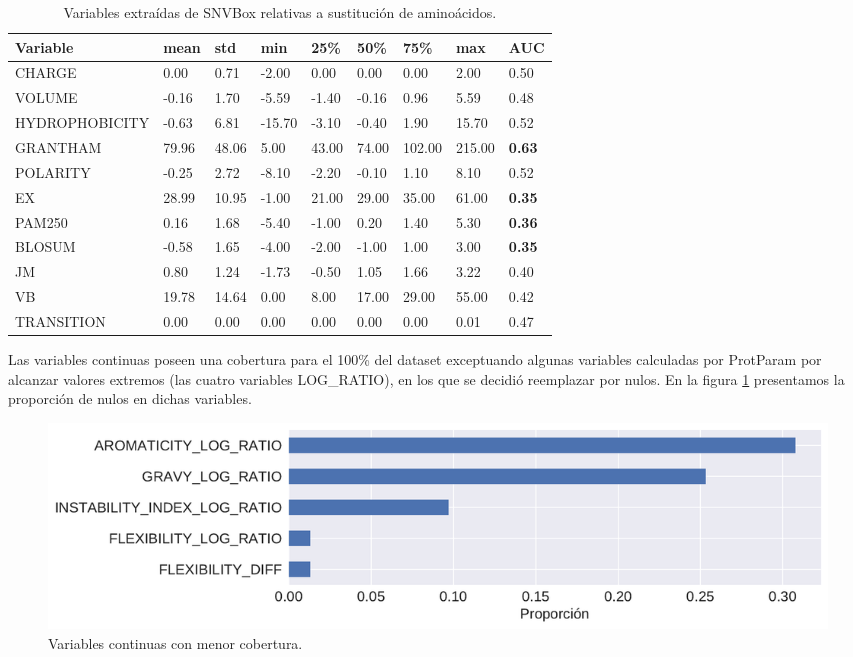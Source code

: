 \begin{table}[H]
\centering
\begin{tabular}{|l|l|l|l|l|l|l|l|l|}
\hline
Variable & mean   & std    & min    & 25\%  & 50\%   & 75\% & max & AUC    \\ \hline
CHARGE            & 0.00  & 0.71   & -2.00  & 0.00  & 0.00   & 0.00 & 2.00 & 0.50   \\ \hline
VOLUME            & -0.16  & 1.70   & -5.59  & -1.40 & -0.16  & 0.96 & 5.59 & 0.48   \\ \hline
HYDROPHOBICITY    & -0.63  & 6.81   & -15.70 & -3.10 & -0.40  & 1.90 & 15.70 & 0.52  \\ \hline
GRANTHAM          & 79.96  & 48.06  & 5.00   & 43.00 & 74.00  & 102.00 & 215.00 &  \textbf{0.63} \\ \hline
POLARITY          & -0.25  & 2.72   & -8.10  & -2.20 & -0.10  & 1.10   & 8.10 & 0.52   \\ \hline
EX                & 28.99  & 10.95  & -1.00  & 21.00 & 29.00  & 35.00  & 61.00 & \textbf{0.35}  \\ \hline
PAM250            & 0.16   & 1.68   & -5.40  & -1.00 & 0.20   & 1.40   & 5.30 & \textbf{0.36}   \\ \hline
BLOSUM            & -0.58  & 1.65   & -4.00  & -2.00 & -1.00  & 1.00   & 3.00 & \textbf{0.35}   \\ \hline
JM                & 0.80   & 1.24   & -1.73  & -0.50 & 1.05   & 1.66   & 3.22 & 0.40   \\ \hline
VB                & 19.78  & 14.64  & 0.00   & 8.00  & 17.00  & 29.00  & 55.00 & 0.42  \\ \hline
TRANSITION        & 0.00   & 0.00   & 0.00   & 0.00  & 0.00   & 0.00   & 0.01 & 0.47   \\ \hline
\end{tabular}
\caption{Variables extraídas de SNVBox relativas a sustitución de aminoácidos.}
\label{tab:snvbox_amino}

\end{table}

Las variables continuas poseen una cobertura para el 100\% del dataset exceptuando algunas variables calculadas por ProtParam por alcanzar valores extremos (las cuatro variables LOG\_RATIO), en los que se decidió reemplazar por nulos. En la figura \ref{fig:proporcion_nulos_structural} presentamos la proporción de nulos en dichas variables.

\begin{figure}[H]
    \centering
    \includegraphics[scale=0.5]{documents/latex/figures/3/structural/proporcion_nulos_structural.pdf}
    \caption{Variables continuas con menor cobertura.}
    \label{fig:proporcion_nulos_structural}
\end{figure}

